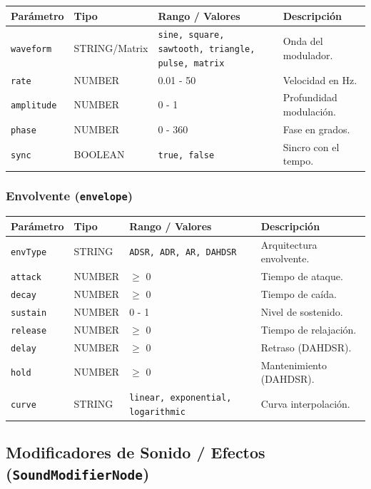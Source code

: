 \begin{table}[H]
\centering
\small
\begin{tabular}{@{}llp{3cm}p{4cm}@{}}
\toprule
Parámetro & Tipo & Rango / Valores & Descripción \\ \midrule
\texttt{waveform} & STRING/Matrix & \texttt{sine, square, sawtooth, triangle, pulse, matrix} & Onda del modulador. \\
\texttt{rate} & NUMBER & 0.01 - 50 & Velocidad en Hz. \\
\texttt{amplitude} & NUMBER & 0 - 1 & Profundidad modulación. \\
\texttt{phase} & NUMBER & 0 - 360 & Fase en grados. \\
\texttt{sync} & BOOLEAN & \texttt{true, false} & Sincro con el tempo. \\ \bottomrule
\end{tabular}
\end{table}

\subsubsection{Envolvente (\texttt{envelope})}

\begin{table}[H]
\centering
\small
\begin{tabular}{@{}llp{3cm}p{4cm}@{}}
\toprule
Parámetro & Tipo & Rango / Valores & Descripción \\ \midrule
\texttt{envType} & STRING & \texttt{ADSR, ADR, AR, DAHDSR} & Arquitectura envolvente. \\
\texttt{attack} & NUMBER & $\ge$ 0 & Tiempo de ataque. \\
\texttt{decay} & NUMBER & $\ge$ 0 & Tiempo de caída. \\
\texttt{sustain} & NUMBER & 0 - 1 & Nivel de sostenido. \\
\texttt{release} & NUMBER & $\ge$ 0 & Tiempo de relajación. \\
\texttt{delay} & NUMBER & $\ge$ 0 & Retraso (DAHDSR). \\
\texttt{hold} & NUMBER & $\ge$ 0 & Mantenimiento (DAHDSR). \\
\texttt{curve} & STRING & \texttt{linear, exponential, logarithmic} & Curva interpolación. \\ \bottomrule
\end{tabular}
\end{table}

\subsection{Modificadores de Sonido / Efectos (\texttt{SoundModifierNode})}

